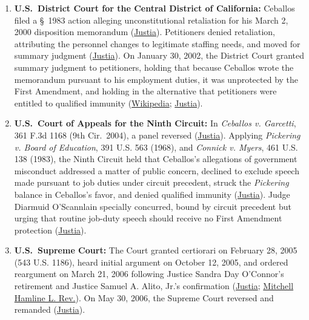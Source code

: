 \documentclass[12pt]{article}
\begin{document}
\begin{enumerate}
  \item \textbf{U.S.\ District Court for the Central District of California:} Ceballos filed a \S~1983 action alleging unconstitutional retaliation for his March 2, 2000 disposition memorandum (\href{https://supreme.justia.com/cases/federal/us/547/410/}{Justia}). Petitioners denied retaliation, attributing the personnel changes to legitimate staffing needs, and moved for summary judgment (\href{https://supreme.justia.com/cases/federal/us/547/410/}{Justia}). On January 30, 2002, the District Court granted summary judgment to petitioners, holding that because Ceballos wrote the memorandum pursuant to his employment duties, it was unprotected by the First Amendment, and holding in the alternative that petitioners were entitled to qualified immunity (\href{https://en.wikipedia.org/wiki/Garcetti_v._Ceballos}{Wikipedia}; \href{https://supreme.justia.com/cases/federal/us/547/410/}{Justia}).
  \item \textbf{U.S.\ Court of Appeals for the Ninth Circuit:} In \textit{Ceballos v. Garcetti}, 361 F.3d 1168 (9th Cir.\ 2004), a panel reversed (\href{https://supreme.justia.com/cases/federal/us/547/410/}{Justia}). Applying \textit{Pickering v. Board of Education}, 391 U.S. 563 (1968), and \textit{Connick v. Myers}, 461 U.S. 138 (1983), the Ninth Circuit held that Ceballos's allegations of government misconduct addressed a matter of public concern, declined to exclude speech made pursuant to job duties under circuit precedent, struck the \textit{Pickering} balance in Ceballos's favor, and denied qualified immunity (\href{https://supreme.justia.com/cases/federal/us/547/410/}{Justia}). Judge Diarmuid O'Scannlain specially concurred, bound by circuit precedent but urging that routine job-duty speech should receive no First Amendment protection (\href{https://supreme.justia.com/cases/federal/us/547/410/}{Justia}).
  \item \textbf{U.S.\ Supreme Court:} The Court granted certiorari on February 28, 2005 (543 U.S. 1186), heard initial argument on October 12, 2005, and ordered reargument on March 21, 2006 following Justice Sandra Day O'Connor's retirement and Justice Samuel A. Alito, Jr.'s confirmation (\href{https://supreme.justia.com/cases/federal/us/547/410/}{Justia}; \href{https://open.mitchellhamline.edu/cgi/viewcontent.cgi?article=1237&context=mhlr}{Mitchell Hamline L. Rev.}). On May 30, 2006, the Supreme Court reversed and remanded (\href{https://supreme.justia.com/cases/federal/us/547/410/}{Justia}).
\end{enumerate}
\end{document}
